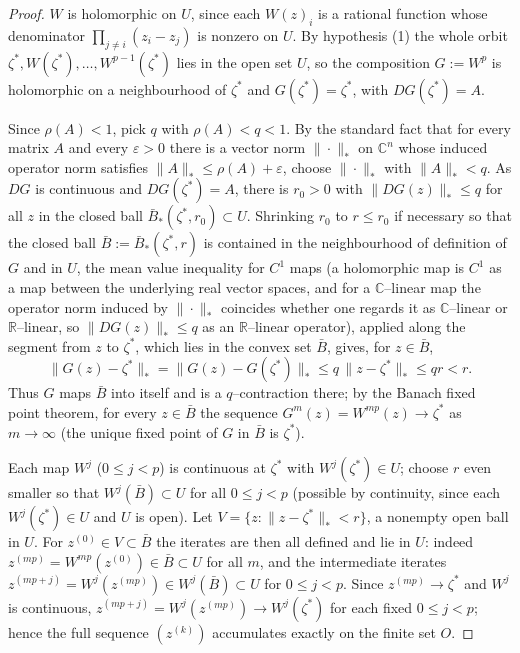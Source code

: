 \documentclass{amsart}
\theoremstyle{definition}
\theoremstyle{remark}
\newcommand{\C}{\mathbb{C}}
\newcommand{\R}{\mathbb{R}}
\begin{document}
\begin{proof}
$W$ is holomorphic on $U$, since each $W(z)_i$ is a rational function whose denominator
$\prod_{j\neq i}(z_i-z_j)$ is nonzero on $U$. By hypothesis (1) the whole orbit
$\zeta^{*},W(\zeta^{*}),\dots,W^{p-1}(\zeta^{*})$ lies in the open set $U$, so the
composition $G:=W^{p}$ is holomorphic on a neighbourhood of $\zeta^{*}$ and
$G(\zeta^{*})=\zeta^{*}$, with $DG(\zeta^{*})=A$.

Since $\rho(A)<1$, pick $q$ with $\rho(A)<q<1$. By the standard fact that for every matrix
$A$ and every $\varepsilon>0$ there is a vector norm $\|\cdot\|_{*}$ on $\C^n$ whose induced
operator norm satisfies $\|A\|_{*}\le\rho(A)+\varepsilon$, choose $\|\cdot\|_{*}$ with
$\|A\|_{*}<q$. As $DG$ is continuous and $DG(\zeta^{*})=A$, there is $r_0>0$ with
$\|DG(z)\|_{*}\le q$ for all $z$ in the closed ball $\bar B_{*}(\zeta^{*},r_0)\subset U$.
Shrinking $r_0$ to $r\le r_0$ if necessary so that the closed ball
$\bar B:=\bar B_{*}(\zeta^{*},r)$ is contained in the neighbourhood of definition of $G$ and
in $U$, the mean value inequality for $C^1$ maps (a holomorphic map is $C^1$ as a map between
the underlying real vector spaces, and for a $\C$--linear map the operator norm induced by
$\|\cdot\|_{*}$ coincides whether one regards it as $\C$--linear or $\R$--linear, so
$\|DG(z)\|_{*}\le q$ as an $\R$--linear operator), applied along the segment from $z$ to
$\zeta^{*}$, which lies in the convex set $\bar B$, gives, for $z\in\bar B$,
\[
\|G(z)-\zeta^{*}\|_{*}=\|G(z)-G(\zeta^{*})\|_{*}\le q\,\|z-\zeta^{*}\|_{*}\le qr<r .
\]
Thus $G$ maps $\bar B$ into itself and is a $q$--contraction there; by the Banach fixed point
theorem, for every $z\in\bar B$ the sequence $G^{m}(z)=W^{mp}(z)\to\zeta^{*}$ as
$m\to\infty$ (the unique fixed point of $G$ in $\bar B$ is $\zeta^{*}$).

Each map $W^{j}$ ($0\le j<p$) is continuous at $\zeta^{*}$ with
$W^{j}(\zeta^{*})\in U$; choose $r$ even smaller so that $W^{j}(\bar B)\subset U$ for all
$0\le j<p$ (possible by continuity, since each $W^{j}(\zeta^{*})\in U$ and $U$ is open). Let
$V=\{z:\|z-\zeta^{*}\|_{*}<r\}$, a nonempty open ball in $U$. For $z^{(0)}\in V\subset\bar B$
the iterates are then all defined and lie in $U$: indeed $z^{(mp)}=W^{mp}(z^{(0)})\in\bar B
\subset U$ for all $m$, and the intermediate iterates $z^{(mp+j)}=W^{j}(z^{(mp)})\in
W^{j}(\bar B)\subset U$ for $0\le j<p$. Since $z^{(mp)}\to\zeta^{*}$ and $W^{j}$ is
continuous, $z^{(mp+j)}=W^{j}(z^{(mp)})\to W^{j}(\zeta^{*})$ for each fixed $0\le j<p$;
hence the full sequence $(z^{(k)})$ accumulates exactly on the finite set $O$.


\end{proof}
\end{document}

